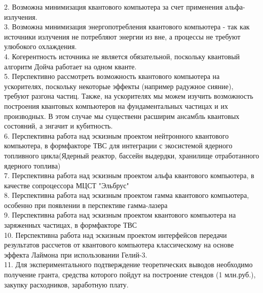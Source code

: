 \documentclass[11pt]{report}
\begin{document}
2. Возможна минимизация квантового компьютера за счет применения альфа-излучения.\\

3. Возможна минимизация энергопотребления квантового компьютера -  так как источники излучения не потребляют энергии из вне, а процессы не требуют улюбокого охлаждения. \\

4. Когерентность источника не является обязательной, поскольку квантовый алгоритм Дойча работает на одном кванте. \\ 

5. Перспективно рассмотреть возможность квантового компьютера на ускорителях, поскольку некоторые эффекты (например радужное сияние), требуют разгона частиц. Также, на ускорителях мы можем изучить возможность построения квантовых компьютеров на фундаментальных частицах и их производных. В этом случае мы существенн расширим ансамбль квантовых состояний, а знгачит и кубитность. \\

6. Перспективна работа над эскизным проектом нейтронного квантового компьютера, в формфакторе ТВС для интеграции с экосистемой ядерного топливного цикла(Ядерный реактор, бассейн выдердки, хранилище отработанного ядерного топлива)\\

7. Перспективна работа над эскизным проектом альфа квантового компьютера, в качестве сопроцессора МЦСТ "Эльбрус"\\

8. Перспективна работа над эскизным проектом гамма квантового компьютера, особенно при появлении в перспективе гамма-лазера\\

9. Перспективна работа над эскизным проектом квантового компьютера на заряженных частицах, в формфакторе ТВС \\

10. Перспективна работа над эскизным проектом интерфейсов передачи результатов рассчетов от квантового компьютера классическому на основе эффекта Лаймона при использовании Гелий-3. \\

11. Для экспериментального подтверждение теоретических выводов необходимо получение гранта, средства которого пойдут на построение стендов (1 млн.руб.), закупку расходников, заработную плату.
\end{document}

